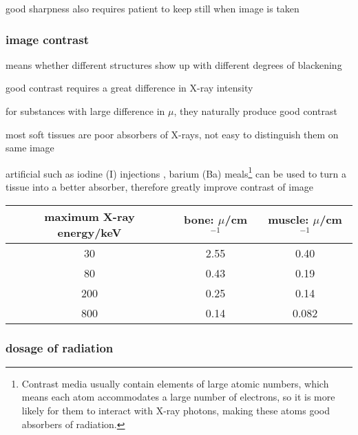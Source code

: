 \cmt good sharpness also requires patient to keep still when image is taken

\subsubsection*{image contrast}

 means whether different structures show up with different degrees of blackening

good contrast requires a great difference in X-ray intensity

\cmt for substances with large difference in $\mu$, they naturally produce good contrast

\cmt most soft tissues are poor absorbers of X-rays, not easy to distinguish them on same image

artificial  such as iodine (I) injections , barium (Ba) meals\footnote{Contrast media usually contain elements of large atomic numbers, which means each atom accommodates a large number of electrons, so it is more likely for them to interact with X-ray photons, making these atoms good absorbers of radiation.} can be used to turn a tissue into a better absorber, therefore greatly improve contrast of image




\newpage


\begin{table}[ht]
	\begin{center}
		\begin{tabular}{|c|c|c|}
			\hline
			maximum X-ray energy/keV & bone: $\mu$/cm$^{-1}$ & muscle: $\mu$/cm$^{-1}$ \\ \hline
			30 & 2.55 & 0.40 \\ \hline
			80 & 0.43 & 0.19 \\ \hline
			200 & 0.25 & 0.14 \\ \hline
			800 & 0.14 & 0.082 \\ \hline
		\end{tabular}
	\end{center}
\end{table}




\subsubsection*{dosage of radiation}


